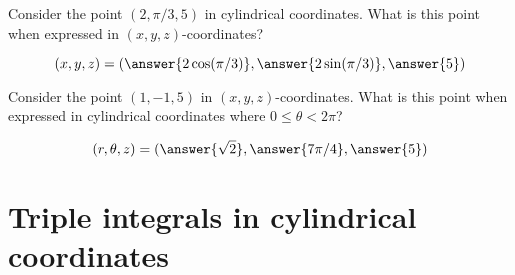 \documentclass{ximera}
\begin{document}
\begin{question}
  Consider the point $(2, \pi/3,5)$ in cylindrical coordinates. What is
  this point when expressed in $(x,y,z)$-coordinates?
  \begin{prompt}
    \[
    (x,y,z) = (\answer{2\cos(\pi/3)}, \answer{2 \sin(\pi/3)},\answer{5})
    \]
  \end{prompt}
  \begin{question}
    Consider the point $(1, -1,5)$ in $(x,y,z)$-coordinates. What is
    this point when expressed in cylindrical coordinates where
    $0\le\theta<2\pi$?
    \begin{prompt}
      \[
      (r,\theta,z) = (\answer{\sqrt{2}}, \answer{7\pi/4},\answer{5})
      \]
    \end{prompt}
  \end{question}
\end{question}

\section{Triple integrals in cylindrical coordinates}
\end{document}
